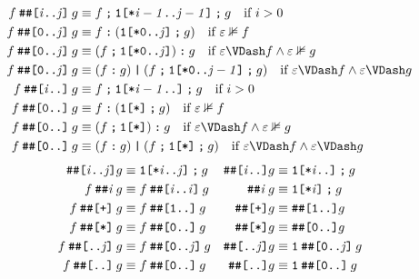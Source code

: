 \documentclass[a4paper,twoside,10pt,DIV=12]{scrreprt}
\newcommand{\OR}{\mathbin{\texttt{|}}}
\newcommand{\FUSION}{\mathbin{\texttt{:}}}
\newcommand{\CONCAT}{\mathbin{\texttt{;}}}
\newcommand{\DELAY}[1]{\mathbin{\texttt{\#\##1}}}
\newcommand{\DELAYR}[1]{\mathbin{\texttt{\#\#[#1]}}}
\newcommand{\DELAYP}[1]{\mathbin{\texttt{\#\#[+]}}}
\newcommand{\DELAYS}[1]{\mathbin{\texttt{\#\#[*]}}}
\newcommand{\0}{\texttt{0}}
\newcommand{\1}{\texttt{1}}
\newcommand{\STAR}[1]{\texttt{[*#1]}}
\newcommand\mvar[1]{\ensuremath{\mathit{#1}}}
\begin{document}
\begin{align*}
  f\DELAYR{\mvar{i}..\mvar{j}}g & \equiv f\CONCAT{}\1\STAR{\mvar{i-1}..\mvar{j-1}}\CONCAT{}g\quad\text{if~}i>0                                                    \\
  f\DELAYR{0..\mvar{j}}g        & \equiv f\FUSION(\1\STAR{0..\mvar{j}}\CONCAT{}g)\quad\text{if~}\varepsilon\nVDash f                                              \\
  f\DELAYR{0..\mvar{j}}g        & \equiv (f\CONCAT{}\1\STAR{0..\mvar{j}})\FUSION{}g\quad\text{if~}\varepsilon\VDash f \land \varepsilon\nVDash g                 \\
  f\DELAYR{0..\mvar{j}}g        & \equiv (f\FUSION{}g)\OR(f\CONCAT{}\1\STAR{0..\mvar{j-1}}\CONCAT{}g)\quad\text{if~}\varepsilon\VDash f \land \varepsilon\VDash g \\
  f\DELAYR{\mvar{i}..}g         & \equiv f\CONCAT{}\1\STAR{\mvar{i-1}..}\CONCAT{}g\quad\text{if~}i>0                                                              \\
  f\DELAYR{0..}g                & \equiv f\FUSION(\1\STAR{}\CONCAT{}g)\quad\text{if~}\varepsilon\nVDash f                                                         \\
  f\DELAYR{0..}g                & \equiv (f\CONCAT{}\1\STAR{})\FUSION{}g\quad\text{if~}\varepsilon\VDash f \land \varepsilon\nVDash g                            \\
  f\DELAYR{0..}g                & \equiv (f\FUSION{}g)\OR(f\CONCAT{}\1\STAR{}\CONCAT{}g)\quad\text{if~}\varepsilon\VDash f \land \varepsilon\VDash g
\end{align*}
\begin{align*}
  \DELAYR{\mvar{i}..\mvar{j}}g  & \equiv \1\STAR{\mvar{i}..\mvar{j}}\CONCAT g & \DELAYR{\mvar{i}..}g  & \equiv \1\STAR{\mvar{i}..}\CONCAT g                       \\
  f\DELAY{\mvar{i}} g           & \equiv f\DELAYR{\mvar{i}..\mvar{i}} g       & {}\DELAY{\mvar{i}} g  & \equiv \1\STAR{\mvar{i}}\CONCAT g                         \\
  f\DELAYP{}g                   & \equiv f\DELAYR{1..}g                       & \DELAYP{} g           & \equiv\DELAYR{1..}g                                       \\
  f\DELAYS{}g                   & \equiv f\DELAYR{0..}g                       & \DELAYS{} g           & \equiv\DELAYR{0..}g                                       \\
  f\DELAYR{..\mvar{j}} g        & \equiv f\DELAYR{0..\mvar{j}} g            & \DELAYR{..\mvar{j}} g & \equiv \1\DELAYR{0..\mvar{j}} g                         \\
  f\DELAYR{..} g                & \equiv f\DELAYR{0..} g                  & \DELAYR{..} g         & \equiv \1\DELAYR{0..} g
\end{align*}
\end{document}
